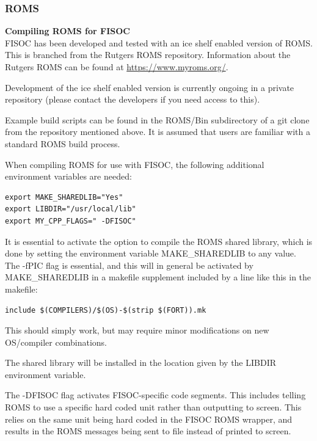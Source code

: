 \documentclass[11pt]{article}
\begin{document}
\subsubsection{ROMS}
\label{sec:PreReqROMS}

\textbf{Compiling ROMS for FISOC} \\
FISOC has been developed and tested with an ice shelf enabled version of ROMS. 
This is branched from the Rutgers ROMS repository.  Information about the Rutgers ROMS 
can be found at \url{https://www.myroms.org/}.

Development of the ice shelf enabled version  is currently ongoing 
in a private repository 
(please contact the developers if you need access to this).

Example build scripts can be found in the ROMS/Bin subdirectory of a git clone 
from the repository mentioned above.
It is assumed that users are familiar with a standard ROMS build process. 


When compiling ROMS for use with FISOC, the following additional environment
variables are needed:
\begin{lstlisting}
export MAKE_SHAREDLIB="Yes"
export LIBDIR="/usr/local/lib"
export MY_CPP_FLAGS=" -DFISOC"
\end{lstlisting}

It is essential to activate the option to compile the ROMS shared library, which 
is done by setting the environment variable MAKE\_SHAREDLIB to any value. 
The -fPIC flag is essential, and this will in general be activated 
by MAKE\_SHAREDLIB in a makefile supplement included by a line like 
this in the makefile:
\begin{lstlisting}
include $(COMPILERS)/$(OS)-$(strip $(FORT)).mk
\end{lstlisting}
This should simply work, but may require minor modifications on new 
OS/compiler combinations.

The shared library will be installed in the location given by the 
 LIBDIR environment variable. 

The -DFISOC flag activates FISOC-specific code segments.  
This includes telling ROMS to use a 
specific hard coded unit rather than outputting to screen.  This relies on the 
same unit being hard coded in the FISOC ROMS wrapper, and results in the ROMS 
messages being sent to file instead of printed to screen.
\end{document}
